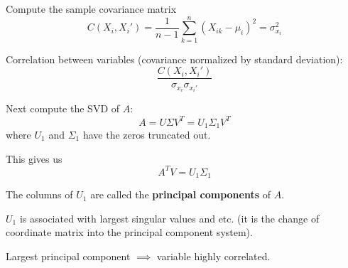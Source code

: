 \documentclass[12pt,letterpaper]{article}
\begin{document}
Compute the sample covariance matrix
\begin{equation}
	C(X_i, X_i') = \frac{1}{n-1} \sum_{k=1}^n (X_{ik} - \mu_i)^2 = \sigma_{x_i}^2
\end{equation}

Correlation between variables (covariance normalized by standard deviation):
\begin{equation}
	\frac{C(X_i, X_i')}{\sigma_{x_i} \sigma_{x_i'}}
\end{equation}

Next compute the SVD of $A$:
\begin{equation}
	A = U \Sigma V^T = U_1 \Sigma_1 V^T
\end{equation}
where $U_1$ and $\Sigma_1$ have the zeros truncated out.

This gives us
\begin{equation}
	A^T V = U_1 \Sigma_1
\end{equation}

The columns of $U_1$ are called the \textbf{principal components} of $A$.

$U_1$ is associated with largest singular values and etc. (it is the change of coordinate matrix into the principal component system).

Largest principal component $\implies$ variable highly correlated.
\end{document}
